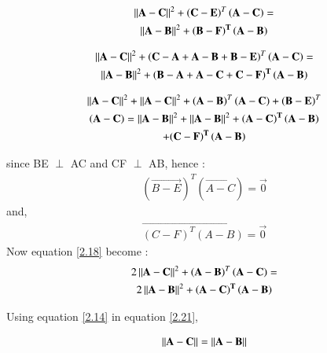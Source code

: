 \documentclass[journal,12pt,twocolumn]{IEEEtran}
\begin{document}
  \begin{multline} 
\left\lVert\mathbf{A - C}\right\rVert^2 + \left ( \mathbf{ C - E }\right)^T \left( \mathbf{A - C} \right)  =  \\ \left\lVert\mathbf{A - B}\right\rVert^2 + \mathbf{\left (  B - F\right)^{T} \left( A - B \right)}
 \end{multline}   
   
    \begin{multline} 
  \left\lVert\mathbf{A - C}\right\rVert^2 + \left ( \mathbf{ C - A + A - B +B - E }\right)^T \left( \mathbf{A - C} \right)  =  \\ \left\lVert\mathbf{A - B}\right\rVert^2 + \mathbf{\left (  B - A + A - C + C - F\right)^{T} \left( A - B \right)}
   \end{multline}   
  
 \begin{multline} 
\left\lVert\mathbf{A - C}\right\rVert^2 +  \left\lVert\mathbf{A - C}\right\rVert^2 + \left ( \mathbf{  A - B  }\right)^T \left( \mathbf{A - C} \right) + \left ( \mathbf{   B - E }\right)^T \\ \left( \mathbf{A - C} \right) =   \left\lVert\mathbf{A - B}\right\rVert^2 + \left\lVert\mathbf{A - B}\right\rVert^2 + \mathbf{\left ( A - C \right)^{T} \left( A - B \right)}  \\ +  \mathbf{\left (  C - F\right)^{T} \left( A - B \right)} \label{2.18}
 \end{multline}    
  
since BE $\perp$ AC and CF $\perp$ AB, hence :
\begin{align}
 \left ( \vec{   B - E }\right)^T \left( \vec{A - C} \right) = \vec{0}
 \end{align}
  and, 
  \begin{align}
   \vec{\left (  C - F\right)^{T} \left( A - B \right)} = \vec{0}
\end{align}
Now equation \ref{2.18} become :
 \begin{multline}
2\left\lVert\mathbf{A - C}\right\rVert^2 + \left ( \mathbf{  A - B  }\right)^T \left( \mathbf{A - C} \right)    =  \\ 2 \left\lVert\mathbf{A - B}\right\rVert^2 + \mathbf{\left ( A - C \right)^{T} \left( A - B \right)} \label{2.21}
 \end{multline} 

  Using equation \ref{2.14} in equation \ref{2.21},
  
  \begin{align}
  \left\lVert\mathbf{A - C} \right\rVert = \left\lVert\mathbf{A - B}\right\rVert
  \end{align}
  
  
  
  
  
  
\end{document}
